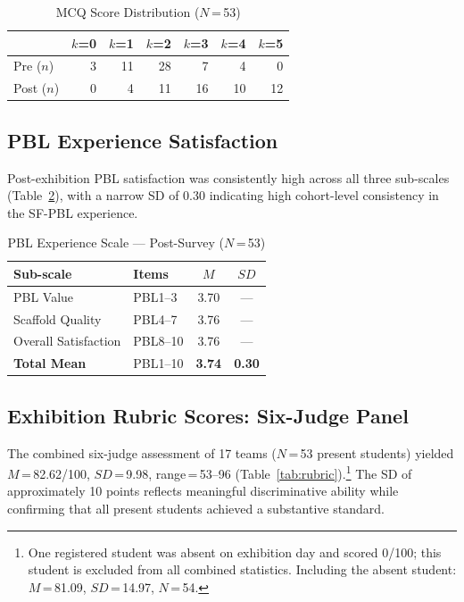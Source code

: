 \documentclass[12pt, a4paper]{article}
\begin{document}
\begin{table}[ht]
\centering
\caption{MCQ Score Distribution ($N$\,=\,53)}
\label{tab:pk_dist}
\begin{tabular}{lrrrrrr}
\toprule
 & \textbf{$k$=0} & \textbf{$k$=1} & \textbf{$k$=2} &
\textbf{$k$=3} & \textbf{$k$=4} & \textbf{$k$=5} \\
\midrule
Pre  ($n$) & 3 & 11 & 28 & 7 & 4 & 0  \\
Post ($n$) & 0 & 4  & 11 & 16 & 10 & 12 \\
\bottomrule
\end{tabular}
\end{table}

\subsection{PBL Experience Satisfaction}

Post-exhibition PBL satisfaction was consistently high across all
three sub-scales (Table~\ref{tab:pbl}), with a narrow SD of 0.30
indicating high cohort-level consistency in the SF-PBL experience.

\begin{table}[ht]
\centering
\caption{PBL Experience Scale --- Post-Survey ($N$\,=\,53)}
\label{tab:pbl}
\begin{tabular}{llcc}
\toprule
\textbf{Sub-scale} & \textbf{Items} & \textbf{$M$} & \textbf{$SD$} \\
\midrule
PBL Value            & PBL1--3  & 3.70 & ---  \\
Scaffold Quality     & PBL4--7  & 3.76 & ---  \\
Overall Satisfaction & PBL8--10 & 3.76 & ---  \\
\textbf{Total Mean}  & PBL1--10 & \textbf{3.74} & \textbf{0.30} \\
\bottomrule
\end{tabular}
\end{table}

\subsection{Exhibition Rubric Scores: Six-Judge Panel}

The combined six-judge assessment of 17 teams ($N$\,=\,53 present
students) yielded $M$\,=\,82.62/100, $SD$\,=\,9.98,
range\,=\,53--96 (Table~\ref{tab:rubric}).\footnote{One registered
student was absent on exhibition day and scored 0/100; this
student is excluded from all combined statistics. Including the
absent student: $M$\,=\,81.09, $SD$\,=\,14.97, $N$\,=\,54.} The
SD of approximately 10 points reflects meaningful discriminative
ability while confirming that all present students achieved a
substantive standard.
\end{document}
